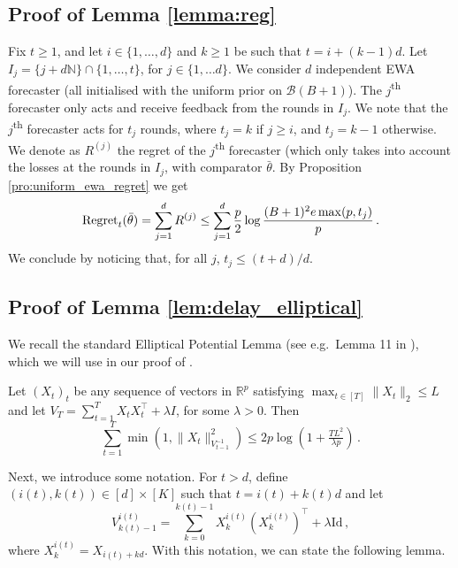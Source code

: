 \subsection[Proof of Lemma 2]{Proof of Lemma \ref{lemma:reg}}
Fix $t\geq 1$, and let $i\in\{1,\dots,d\}$ and $k\geq 1$ be such that $t = i + (k-1)d$. Let $I_j = \{j+d\mathbb N\}\cap \{1,\dots, t\}$, for $j\in\{1,\dots d\}$. We consider $d$ independent EWA forecaster (all initialised with the uniform prior on $\mathcal B(B+1)$). The $j$\textsuperscript{th} forecaster only acts and receive feedback from the rounds in $I_j$. We note that the $j$\textsuperscript{th} forecaster acts for $t_j$ rounds, where $t_j = k$ if $j\geq i$, and $t_j=k-1$ otherwise. We denote as $R^{(j)}$ the regret of the $j$\textsuperscript{th} forecaster (which only takes into account the losses at the rounds in $I_j$, with comparator $\bar\theta$. By Proposition \ref{pro:uniform_ewa_regret} we get 
$$\mathrm{Regret}_t(\bar\theta) = \sum_{j=1}^d R^{(j)}\leq \sum_{j=1}^d \frac{p}{2}\log\frac{(B+1)^2e\max(p,t_j)}{p}\,.$$
We conclude by noticing that, for all $j$, $t_j\leq (t+d)/d$. 






\subsection{Proof of Lemma \ref{lem:delay_elliptical}}
\label{proof:delay_elliptical}
We recall the standard Elliptical Potential Lemma (see e.g.\ Lemma 11 in \citealp{abbasi2011improved}), which we will use in our proof of .

\begin{lemma}
\label{lemma:elliptical_potential}
Let $(X_t)_t$ be any sequence of vectors in $\mathbb{R}^p$ satisfying $\max_{t \in [T]}\|X_t\|_2 \leq L$ and let $V_T = \sum_{t=1}^{T}X_tX_t^{\top} + \lambda I$, for some $\lambda > 0$. Then
\begin{equation*}
\sum_{t=1}^{T}\min(1, \|X_t\|_{V_{t-1}^{-1}}^2) \leq 2p\log(1 + \tfrac{TL^2}{\lambda p})\,.
\end{equation*}
\end{lemma}


Next, we introduce some notation. For $t>d$, define $(i(t),k(t)) \in [d]\times[K]$ such that $t=i(t) +k(t)d$ and let $$V_{k(t)-1}^{i(t)}=\sum_{k=0}^{k(t)-1}X_{k}^{i(t)}(X_{k}^{i(t)})^{\top}+\lambda \mathrm{Id}\,, $$ 
where $X_{k}^{i(t)}=X_{i(t)+kd}$. With this notation, we can state the following lemma.

